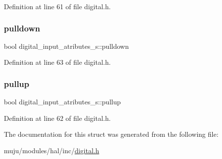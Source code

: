 Definition at line 61 of file digital.\+h.

\mbox{\label{structdigital__input__atributes__s_aaf0e965572aaf3526c3e0375600b8751}} 
\subsubsection{\texorpdfstring{pulldown}{pulldown}}
{\footnotesize\ttfamily bool digital\+\_\+input\+\_\+atributes\+\_\+s\+::pulldown}



Definition at line 63 of file digital.\+h.

\mbox{\label{structdigital__input__atributes__s_a6ec80ac384d462fe6869744f4015158f}} 
\subsubsection{\texorpdfstring{pullup}{pullup}}
{\footnotesize\ttfamily bool digital\+\_\+input\+\_\+atributes\+\_\+s\+::pullup}



Definition at line 62 of file digital.\+h.



The documentation for this struct was generated from the following file\+:\begin{DoxyCompactItemize}
\item 
muju/modules/hal/inc/\hyperlink{muju_2modules_2hal_2inc_2digital_8h}{digital.\+h}\end{DoxyCompactItemize}
